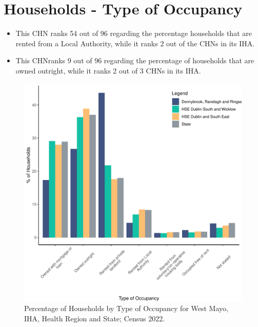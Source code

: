 \documentclass{article}
\begin{document}
\section{Households - Type of Occupancy}\label{sect:Households}
\begin{itemize}
\item This CHN ranks  54 out of 96 regarding the percentage households that are rented from a Local Authority, while it ranks  2 out of the CHNs in its IHA. 
\item This CHNranks  9 out of 96 regarding the percentage of households that are owned outright, while it ranks   2 out of 3 CHNs in its IHA.
\end{itemize}
\begin{figure}[H]
	\centering
	\includegraphics[width = 140mm]{../figures/HouseholdsED.pdf}
	\caption{Percentage of Households by Type of Occupancy for West Mayo, IHA, Health Region and State; Census 2022.}
	\label{fig:vbnv}
	\end{figure}
\end{document}
